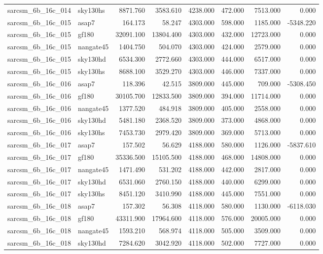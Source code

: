 \begin{tabular}{llrrrrrr}
sarcsm\_6b\_16c\_014 & sky130hs & 8871.760 & 3583.610 & 4238.000 & 472.000 & 7513.000 & 0.000 \\
sarcsm\_6b\_16c\_015 & asap7 & 164.173 & 58.247 & 4303.000 & 598.000 & 1185.000 & -5348.220 \\
sarcsm\_6b\_16c\_015 & gf180 & 32091.100 & 13804.400 & 4303.000 & 432.000 & 12723.000 & 0.000 \\
sarcsm\_6b\_16c\_015 & nangate45 & 1404.750 & 504.070 & 4303.000 & 424.000 & 2579.000 & 0.000 \\
sarcsm\_6b\_16c\_015 & sky130hd & 6534.300 & 2772.660 & 4303.000 & 444.000 & 6517.000 & 0.000 \\
sarcsm\_6b\_16c\_015 & sky130hs & 8688.100 & 3529.270 & 4303.000 & 446.000 & 7337.000 & 0.000 \\
sarcsm\_6b\_16c\_016 & asap7 & 118.396 & 42.515 & 3809.000 & 445.000 & 709.000 & -5308.450 \\
sarcsm\_6b\_16c\_016 & gf180 & 30105.700 & 12833.500 & 3809.000 & 394.000 & 11714.000 & 0.000 \\
sarcsm\_6b\_16c\_016 & nangate45 & 1377.520 & 484.918 & 3809.000 & 405.000 & 2558.000 & 0.000 \\
sarcsm\_6b\_16c\_016 & sky130hd & 5481.180 & 2368.520 & 3809.000 & 373.000 & 4868.000 & 0.000 \\
sarcsm\_6b\_16c\_016 & sky130hs & 7453.730 & 2979.420 & 3809.000 & 369.000 & 5713.000 & 0.000 \\
sarcsm\_6b\_16c\_017 & asap7 & 157.502 & 56.629 & 4188.000 & 580.000 & 1126.000 & -5837.610 \\
sarcsm\_6b\_16c\_017 & gf180 & 35336.500 & 15105.500 & 4188.000 & 468.000 & 14808.000 & 0.000 \\
sarcsm\_6b\_16c\_017 & nangate45 & 1471.490 & 531.202 & 4188.000 & 442.000 & 2817.000 & 0.000 \\
sarcsm\_6b\_16c\_017 & sky130hd & 6531.060 & 2760.150 & 4188.000 & 440.000 & 6299.000 & 0.000 \\
sarcsm\_6b\_16c\_017 & sky130hs & 8451.120 & 3410.990 & 4188.000 & 445.000 & 7551.000 & 0.000 \\
sarcsm\_6b\_16c\_018 & asap7 & 157.302 & 56.308 & 4118.000 & 580.000 & 1130.000 & -6118.030 \\
sarcsm\_6b\_16c\_018 & gf180 & 43311.900 & 17964.600 & 4118.000 & 576.000 & 20005.000 & 0.000 \\
sarcsm\_6b\_16c\_018 & nangate45 & 1593.210 & 568.974 & 4118.000 & 505.000 & 3509.000 & 0.000 \\
sarcsm\_6b\_16c\_018 & sky130hd & 7284.620 & 3042.920 & 4118.000 & 502.000 & 7727.000 & 0.000 \\

\end{tabular}

